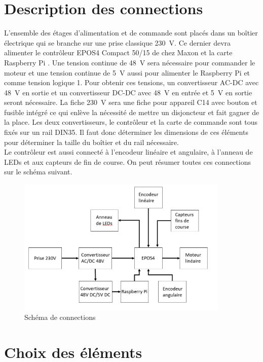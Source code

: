 \section{Description des connections}\label{sec:DescConnect}
L'ensemble des étages d'alimentation et de commande sont placés dans un boîtier électrique qui se branche sur une prise classique 230~V. Ce dernier
devra alimenter le contrôleur EPOS4 Compact 50/15 de chez Maxon \cite{Maxon} et la carte Raspberry Pi \cite{RaspberryPi}. Une tension continue de 48~V
sera nécessaire pour commander le moteur et une tension continue de 5~V aussi pour alimenter le Raspberry Pi et comme tension logique 1. Pour obtenir
ces tensions, un convertisseur AC-DC avec 48~V en sortie et un convertisseur DC-DC avec 48~V en entrée et 5~V en sortie seront nécessaire. La fiche 230~V
sera une fiche pour appareil C14 avec bouton et fusible intégré ce qui enlève la nécessité de mettre un disjoncteur et fait gagner de la place. Les deux
convertisseurs, le contrôleur et la carte de commande sont tous fixés sur un rail DIN35. Il faut donc déterminer les dimensions de ces éléments pour
déterminer la taille du boîtier et du rail nécessaire.\\

Le contrôleur est aussi connecté à l'encodeur linéaire et angulaire, à l'anneau de LEDs et aux capteurs de fin de course. On peut résumer toutes
ces connections sur le schéma suivant.

\begin{figure}[H]
  \centering
  \includegraphics[width = 0.9\textwidth]{assets/figures/SchemaLogique.png}
  \caption{Schéma de connections}
  \label{fig:SchemaConnec}
\end{figure}

\section{Choix des éléments}\label{sec:ChoixElem}

